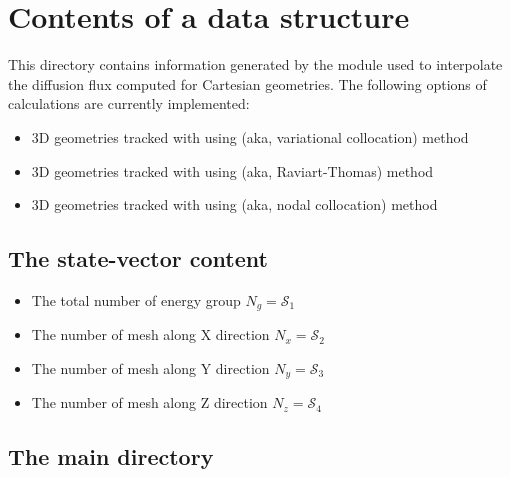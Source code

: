 \section{Contents of a  data structure}\label{sect:dfview}

This directory contains information generated by the  module used to interpolate the diffusion flux computed for Cartesian geometries. The following options of calculations are currently implemented:
\begin{itemize}
\item 3D geometries tracked with  using  (aka, variational collocation) method
\item 3D geometries tracked with  using  (aka, Raviart-Thomas) method
\item 3D geometries tracked with  using  (aka, nodal collocation) method
\end{itemize}

\subsection{The state-vector content}\label{sect:fviewstate}

\begin{itemize}

\item The total number of energy group $N_{g} = \mathcal{S}_{1}$

\item The number of mesh along X direction $N_{x} = \mathcal{S}_{2}$

\item The number of mesh along Y direction $N_{y} = \mathcal{S}_{3}$

\item The number of mesh along Z direction $N_{z} = \mathcal{S}_{4}$

\end{itemize}

\subsection{The main  directory}\label{sect:fviewdir}

